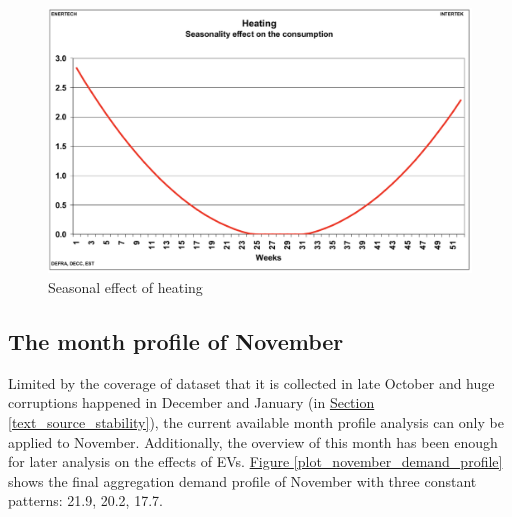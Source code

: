 \documentclass[12pt,a4paper]{report}
\begin{document}
                \begin{figure}[ht]
                    \centerline{\includegraphics[scale=1]{heating_season_effect}}
                    \caption{Seasonal effect of heating}
                    \label{plot_heating_season_effect}
                \end{figure}

                \subsection{The month profile of November}
                    Limited by the coverage of dataset that it is collected in late October and huge corruptions happened in December and January (in \hyperref[text_source_stability]{Section \ref*{text_source_stability}}), the current available month profile analysis can only be applied to November. Additionally, the overview of this month has been enough for later analysis on the effects of EVs.
                    \hyperref[plot_november_demand_profile]{Figure \ref*{plot_november_demand_profile}} shows the final aggregation demand profile of November with three constant patterns: 21.9, 20.2, 17.7.
\end{document}
